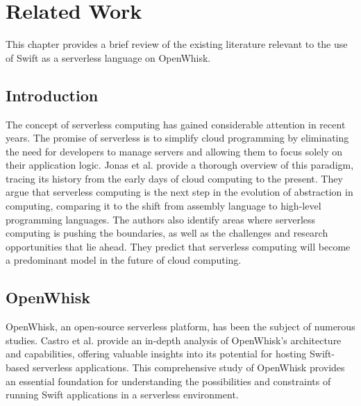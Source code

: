 \chapter{Related Work}
\label{chap:relatedwork}

This chapter provides a brief review of the existing literature relevant to the use of Swift as a serverless language on OpenWhisk. 

\section{Introduction}
The concept of serverless computing has gained considerable attention in recent years. The promise of serverless is to simplify cloud programming by eliminating the need for developers to manage servers and allowing them to focus solely on their application logic. Jonas et al. \cite{Jonas:EECS-2019-3} provide a thorough overview of this paradigm, tracing its history from the early days of cloud computing to the present. They argue that serverless computing is the next step in the evolution of abstraction in computing, comparing it to the shift from assembly language to high-level programming languages. The authors also identify areas where serverless computing is pushing the boundaries, as well as the challenges and research opportunities that lie ahead. They predict that serverless computing will become a predominant model in the future of cloud computing.

\section{OpenWhisk}
OpenWhisk, an open-source serverless platform, has been the subject of numerous studies. Castro et al. \cite{castro2020openwhisk} provide an in-depth analysis of OpenWhisk's architecture and capabilities, offering valuable insights into its potential for hosting Swift-based serverless applications. This comprehensive study of OpenWhisk provides an essential foundation for understanding the possibilities and constraints of running Swift applications in a serverless environment.

